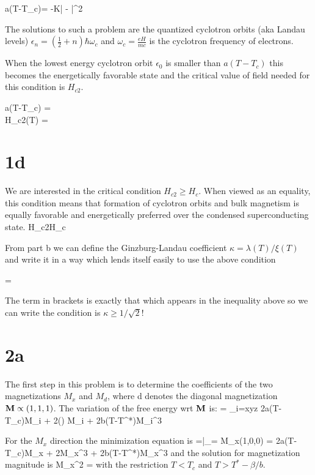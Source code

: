 \documentclass[a4paper,11pt]{article}
\begin{document}
\be
a(T-T_c)\psi = -K\bigg| - \vA\bigg|^2\psi
\ee

The solutions to such a problem are the quantized cyclotron orbits (aka Landau levels) $\epsilon_n = (\frac{1}{2} + n)\hbar\omega_c$ and $\omega_c=\frac{eH}{mc}$ is the cyclotron frequency of electrons.

When the lowest energy cyclotron orbit $\epsilon_0$ is smaller than $a(T-T_c)$ this becomes the energetically favorable state and the critical value of field needed for this condition is $H_{c2}$.

\bea
a(T-T_c) = \\
\Rightarrow H_{c2}(T) = 
\eea

\section*{1d}

We are interested in the critical condition $H_{c2}\geq H_c$. When viewed as an equality, this condition means that formation of cyclotron orbits and bulk magnetism is equally favorable and energetically preferred over the condensed superconducting state.
\bea
H_{c2}\geq H_c \\
\Rightarrow{}\sqrt{\frac{\beta}{4\pi}} 
\eea

From part b we can define the Ginzburg-Landau coefficient $\kappa = \lambda(T)/\xi(T)$ and write it in a way which lends itself easily to use the above condition

\be
\kappa = 
\ee

The term in brackets is exactly that which appears in the inequality above so we can write the condition is $\kappa\geq 1/\sqrt{2}$!

\section*{2a}
The first step in this problem is to determine the coefficients of the two magnetizations $M_x$ and $M_d$, where d denotes the diagonal magnetization ${\bf M}\propto(1,1,1)$. The variation of the free energy wrt ${\bf M}$ is:
\be
{} = \sum_{i=xyz} 2a(T-T_c)M_i + 2\beta(\vM\cdot\vM) M_i + 2b(T-T^*)M_i^3
\ee

For the $M_x$ direction the minimization equation is
=\bigg|_{\vM = M_x(1,0,0)} = 2a(T-T_c)M_x + 2\beta M_x^3 + 2b(T-T^*)M_x^3
\ee
and the solution for magnetization magnitude is
\be
M_x^2 = 
\ee
with the restriction $T<T_c$ and $T>T^*-\beta/b$.
\end{document}
